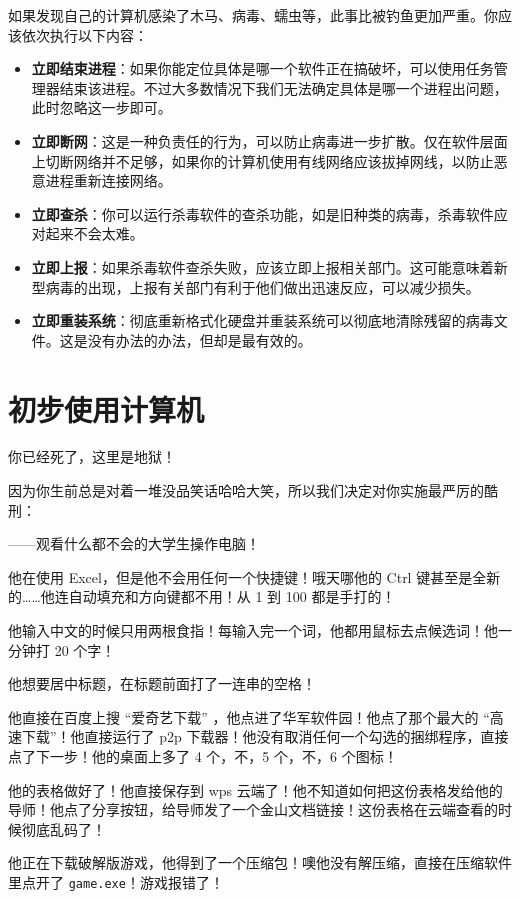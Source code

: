 如果发现自己的计算机感染了木马、病毒、蠕虫等，此事比被钓鱼更加严重。你应该依次执行以下内容：

\begin{itemize}
  \item \textbf{立即结束进程}：如果你能定位具体是哪一个软件正在搞破坏，可以使用任务管理器结束该进程。不过大多数情况下我们无法确定具体是哪一个进程出问题，此时忽略这一步即可。
  \item \textbf{立即断网}：这是一种负责任的行为，可以防止病毒进一步扩散。仅在软件层面上切断网络并不足够，如果你的计算机使用有线网络应该拔掉网线，以防止恶意进程重新连接网络。
  \item \textbf{立即查杀}：你可以运行杀毒软件的查杀功能，如是旧种类的病毒，杀毒软件应对起来不会太难。
  \item \textbf{立即上报}：如果杀毒软件查杀失败，应该立即上报相关部门。这可能意味着新型病毒的出现，上报有关部门有利于他们做出迅速反应，可以减少损失。
  \item \textbf{立即重装系统}：彻底重新格式化硬盘并重装系统可以彻底地清除残留的病毒文件。这是没有办法的办法，但却是最有效的。
\end{itemize}

\section{初步使用计算机}

你已经死了，这里是地狱！

因为你生前总是对着一堆没品笑话哈哈大笑，所以我们决定对你实施最严厉的酷刑：

——观看什么都不会的大学生操作电脑！

他在使用 Excel，但是他不会用任何一个快捷键！哦天哪他的 Ctrl 键甚至是全新的……他连自动填充和方向键都不用！从 1 到 100 都是手打的！

他输入中文的时候只用两根食指！每输入完一个词，他都用鼠标去点候选词！他一分钟打 20 个字！

他想要居中标题，在标题前面打了一连串的空格！

他直接在百度上搜 “爱奇艺下载” ，他点进了华军软件园！他点了那个最大的 “高速下载”！他直接运行了 p2p 下载器！他没有取消任何一个勾选的捆绑程序，直接点了下一步！他的桌面上多了 4 个，不，5 个，不，6 个图标！

他的表格做好了！他直接保存到 wps 云端了！他不知道如何把这份表格发给他的导师！他点了分享按钮，给导师发了一个金山文档链接！这份表格在云端查看的时候彻底乱码了！

他正在下载破解版游戏，他得到了一个压缩包！噢他没有解压缩，直接在压缩软件里点开了 \texttt{game.exe}！游戏报错了！

